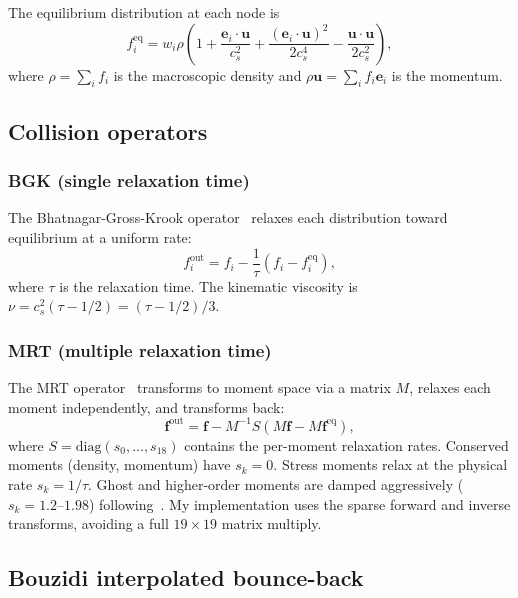 \documentclass[10pt,twocolumn]{article}
\begin{document}
The equilibrium distribution at each node is
%
\begin{equation}
f_i^{\text{eq}} = w_i \rho \left(
  1 + \frac{\mathbf{e}_i \cdot \mathbf{u}}{c_s^2}
  + \frac{(\mathbf{e}_i \cdot \mathbf{u})^2}{2 c_s^4}
  - \frac{\mathbf{u} \cdot \mathbf{u}}{2 c_s^2}
\right),
\label{eq:feq}
\end{equation}
%
where $\rho = \sum_i f_i$ is the macroscopic density and $\rho
\mathbf{u} = \sum_i f_i \mathbf{e}_i$ is the momentum.

\subsection{Collision operators}

\subsubsection{BGK (single relaxation time)}

The Bhatnagar-Gross-Krook operator~\cite{bgk1954} relaxes each
distribution toward equilibrium at a uniform rate:
%
\begin{equation}
f_i^{\text{out}} = f_i - \frac{1}{\tau}(f_i - f_i^{\text{eq}}),
\end{equation}
%
where $\tau$ is the relaxation time. The kinematic viscosity is $\nu =
c_s^2(\tau - 1/2) = (\tau - 1/2)/3$.

\subsubsection{MRT (multiple relaxation time)}

The MRT operator~\cite{dhumieres2002} transforms to moment space via a
matrix $M$, relaxes each moment independently, and transforms back:
%
\begin{equation}
\mathbf{f}^{\text{out}} = \mathbf{f}
  - M^{-1} S (M \mathbf{f} - M \mathbf{f}^{\text{eq}}),
\end{equation}
%
where $S = \text{diag}(s_0, \ldots, s_{18})$ contains the per-moment
relaxation rates. Conserved moments (density, momentum) have $s_k = 0$.
Stress moments relax at the physical rate $s_k = 1/\tau$. Ghost and
higher-order moments are damped aggressively ($s_k = 1.2$--$1.98$)
following~\cite{dhumieres2002}. My implementation uses the sparse
forward and inverse transforms, avoiding a full $19 \times 19$ matrix
multiply.

\subsection{Bouzidi interpolated bounce-back}
\label{sec:bouzidi}
\end{document}
